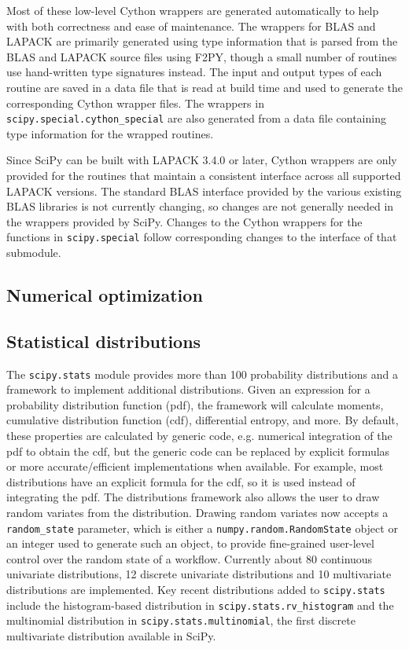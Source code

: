 \documentclass[fleqn,10pt]{wlscirep}
\begin{document}
Most of these low-level Cython wrappers are generated automatically to help
with both correctness and ease of maintenance.  The wrappers for BLAS and
LAPACK are primarily generated using type information that is parsed from the
BLAS and LAPACK source files using F2PY\cite{peterson2009f2py}, though a small
number of routines use hand-written type signatures instead.  The input and
output types of each routine are saved in a data file that is read at build
time and used to generate the corresponding Cython wrapper files.  The wrappers
in \texttt{scipy.{\allowbreak}special.{\allowbreak}cython\_special} are also
generated from a data file containing type information for the wrapped
routines.

Since SciPy can be built with LAPACK 3.4.0 or later, Cython wrappers are only
provided for the routines that maintain a consistent interface across all
supported LAPACK versions.  The standard BLAS interface provided by the various
existing BLAS libraries is not currently changing, so changes are not generally
needed in the wrappers provided by SciPy.  Changes to the Cython wrappers for
the functions in \texttt{scipy.{\allowbreak}special} follow corresponding
changes to the interface of that submodule.

\subsection*{Numerical optimization}



\subsection*{Statistical distributions}

The \texttt{scipy.stats} module provides more than 100 probability
distributions and a framework to implement additional distributions. Given an
expression for a probability distribution function (pdf), the framework will
calculate moments, cumulative distribution function (cdf), differential
entropy, and more. By default, these properties are calculated by generic code, e.g.
numerical integration of the pdf to obtain the cdf, but the
generic code can be replaced by explicit formulas or more accurate/efficient
implementations when available. For example, most distributions have an explicit formula for
the cdf, so it is used instead of integrating the pdf. The distributions
framework also allows the user to draw random variates from the distribution.
Drawing random variates now accepts a \texttt{random\_state} parameter, which
is either a \texttt{numpy.random.RandomState} object or an integer used to
generate such an object, to provide fine-grained user-level control over the
random state of a workflow.  Currently about 80 continuous univariate
distributions, 12 discrete univariate distributions and 10 multivariate
distributions are implemented.  Key recent distributions added to
\texttt{scipy.stats} include the histogram-based distribution in
\texttt{scipy.stats.rv\_histogram} and the multinomial distribution in
\texttt{scipy.stats.multinomial}, the first discrete multivariate distribution 
available in SciPy.
\end{document}
